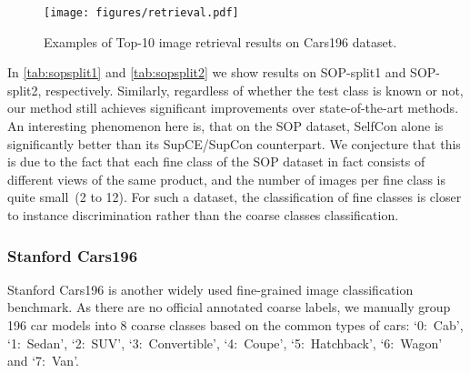 \documentclass[10pt,twocolumn,letterpaper]{article}
\begin{document}
\begin{figure*}[htbp]
    \centering
    \texttt{[image: figures/retrieval.pdf]}
    \caption{Examples of Top-10 image retrieval results on Cars196 dataset.}
    \label{fig:cars_retrieval}
\end{figure*}


In \cref{tab:sopsplit1} and \cref{tab:sopsplit2} we show results on SOP-split1 and SOP-split2, respectively. Similarly, regardless of whether the test class is known or not, our method still achieves significant improvements over state-of-the-art methods. 
An interesting phenomenon here is, that on the SOP dataset, SelfCon alone is significantly better than its SupCE/SupCon counterpart. We conjecture that this is due to the fact that each fine class of the SOP dataset in fact consists of different views of the same product, and the number of images per fine class is quite small~(2 to 12). For such a dataset, the classification of fine classes is closer to instance discrimination rather than the coarse classes classification.


\subsubsection{Stanford Cars196}
Stanford Cars196 is another widely used fine-grained image classification benchmark. As there are no official annotated coarse labels, we manually group 196 car models into 8 coarse classes based on the common types of cars: `0:~Cab', `1:~Sedan', `2:~SUV', `3:~Convertible', `4:~Coupe', `5:~Hatchback', `6:~Wagon' and `7:~Van'.
\end{document}
